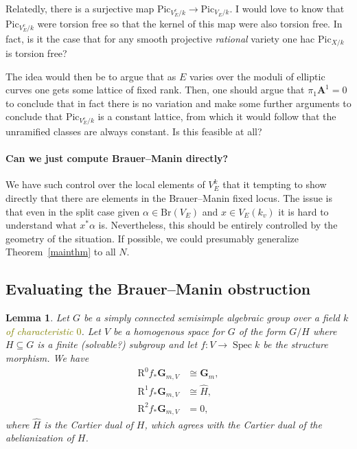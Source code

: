 \documentclass[10pt,letterpaper,twoside]{article}
\newcommand{\BA}[1]{\textcolor{olive}{#1}}
\newcommand{\R}{\mathrm{R}}
\renewcommand{\1}{\mathbf{1}}
\newcommand{\bA}{\mathbf{A}}
\newcommand{\bG}{\mathbf{G}}
\newcommand{\Gm}{\bG_{m}}
\newcommand{\Pic}{\mathrm{Pic}}
\newcommand{\Br}{\mathrm{Br}}
\DeclareMathOperator{\Spec}{Spec}
\newcommand{\iso}{\cong}
\theoremstyle{plain}
\newtheorem{lemma}[theorem]{Lemma}
\theoremstyle{plain}
\theoremstyle{definition}
\theoremstyle{named}
\theoremstyle{definition}
\begin{document}
Relatedly, there is a surjective map $\Pic_{V^c_E/k}\rightarrow\Pic_{V_E/k}$. I would love to know
that $\Pic_{V^c_E/k}$ were torsion free so that the kernel of this map were also torsion free. In
fact, is it the case that for any smooth projective {\em rational} variety one hac $\Pic_{X/k}$ is
torsion free?

The idea would then be to argue that as $E$ varies over the moduli of elliptic curves one gets some
lattice of fixed rank. Then, one should argue that $\pi_1\bA^1=0$ to conclude that in fact there is
no variation and make some further arguments to conclude that $\Pic_{V^c_E/k}$ is a constant
lattice, from which it would follow that the unramified classes are always constant. Is this
feasible at all?

\paragraph{Can we just compute Brauer--Manin directly?} We have such control over the local elements
of $V_E^k$ that it tempting to show directly that there are elements in the Brauer--Manin fixed
locus. The issue is that even in the split case given $\alpha\in\Br(V_E)$ and $x\in V_E(k_v)$ it is
hard to understand what $x^*\alpha$ is.
Nevertheless, this should be entirely controlled by the geometry of the situation. If possible, we
could presumably generalize Theorem~\ref{mainthm} to all $N$.



\subsection{Evaluating the Brauer--Manin obstruction}


\begin{lemma}
    Let $G$ be a simply connected semisimple algebraic group over a field $k$ \BA{of characteristic
    $0$}. Let $V$ be a homogenous space for $G$ of
    the form $G/H$ where $H\subseteq G$ is a finite (solvable?) subgroup and let $f\colon
    V\rightarrow\Spec k$ be the structure morphism. We have
    \begin{align*}
        \R^0f_*\bG_{m,V}&\iso\Gm,\\
        \R^1f_*\bG_{m,V}&\iso\widehat{H},\\
        \R^2f_*\bG_{m,V}&=0,
    \end{align*}
    where $\widehat{H}$ is the Cartier dual of $H$, which agrees with the Cartier dual of the
    abelianization of $H$.
\end{lemma}
\end{document}
